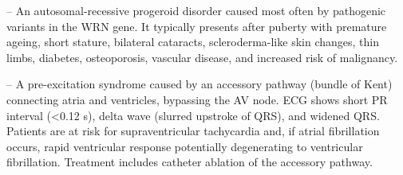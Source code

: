 -- An autosomal-recessive progeroid disorder caused most often by pathogenic variants in the WRN gene. It typically presents after puberty with premature ageing, short stature, bilateral cataracts, scleroderma-like skin changes, thin limbs, diabetes, osteoporosis, vascular disease, and increased risk of malignancy.

-- A pre-excitation syndrome caused by an accessory pathway (bundle of Kent) connecting atria and ventricles, bypassing the AV node. ECG shows short PR interval (<0.12 s), delta wave (slurred upstroke of QRS), and widened QRS. Patients are at risk for supraventricular tachycardia and, if atrial fibrillation occurs, rapid ventricular response potentially degenerating to ventricular fibrillation. Treatment includes catheter ablation of the accessory pathway.
